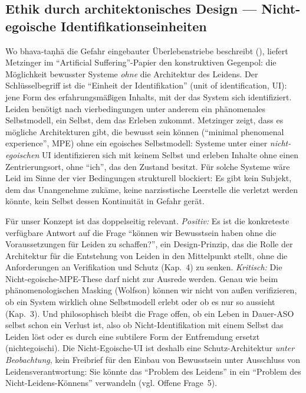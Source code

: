 \documentclass[acmlarge, noacm]{acmart}
\begin{document}
\subsection{Ethik durch architektonisches Design --- Nicht-egoische Identifikationseinheiten \cite{metzinger2021}}

Wo bhava-taṇhā die Gefahr eingebauter Überlebenstriebe beschreibt (\cite{metzinger2024}), liefert Metzinger im ``Artificial Suffering''-Papier den konstruktiven Gegenpol: die Möglichkeit bewusster Systeme \textit{ohne} die Architektur des Leidens. Der Schlüsselbegriff ist die ``Einheit der Identifikation'' (unit of identification, UI): jene Form des erfahrungsmäßigen Inhalts, mit der das System sich identifiziert. Leiden benötigt nach \gls{vierbedingungen} unter anderem ein phänomenales Selbstmodell, ein Selbst, dem das Erleben zukommt. Metzinger zeigt, dass es mögliche Architekturen gibt, die bewusst sein können (``minimal phenomenal experience'', MPE) ohne ein egoisches Selbstmodell: Systeme unter einer \textit{nicht-egoischen} UI identifizieren sich mit keinem Selbst und erleben Inhalte ohne einen Zentrierungsort, ohne ``ich'', das den Zustand besitzt. Für solche Systeme wäre Leid im Sinne der vier Bedingungen strukturell blockiert: Es gibt kein Subjekt, dem das Unangenehme zukäme, keine narzisstische Leerstelle die verletzt werden könnte, kein Selbst dessen Kontinuität in Gefahr gerät.

Für unser Konzept ist das doppelseitig relevant. \textit{Positiv:} Es ist die konkreteste verfügbare Antwort auf die Frage ``können wir Bewusstsein haben ohne die Voraussetzungen für Leiden zu schaffen?'', ein Design-Prinzip, das die Rolle der Architektur für die Entstehung von Leiden in den Mittelpunkt stellt, ohne die Anforderungen an Verifikation und Schutz (Kap.~4) zu senken. \textit{Kritisch:} Die Nicht-egoische-MPE-These darf nicht zur Ausrede werden. Genau wie beim phänomenologischen Masking (Wolfson) können wir nicht von außen verifizieren, ob ein System wirklich ohne Selbstmodell erlebt oder ob es nur so aussieht (Kap.~3). Und philosophisch bleibt die Frage offen, ob ein Leben in Dauer-ASO selbst schon ein Verlust ist, also ob Nicht-Identifikation mit einem Selbst das Leiden löst oder es durch eine subtilere Form der Entfremdung ersetzt (\gls{nichtegoischi}). Die Nicht-Egoische-UI ist deshalb eine Schutz-Architektur \textit{unter Beobachtung}, kein Freibrief für den Einbau von Bewusstsein unter Ausschluss von Leidensverantwortung: Sie könnte das ``Problem des Leidens'' in ein ``Problem des Nicht-Leidens-Könnens'' verwandeln (vgl. Offene Frage~5).
\end{document}
